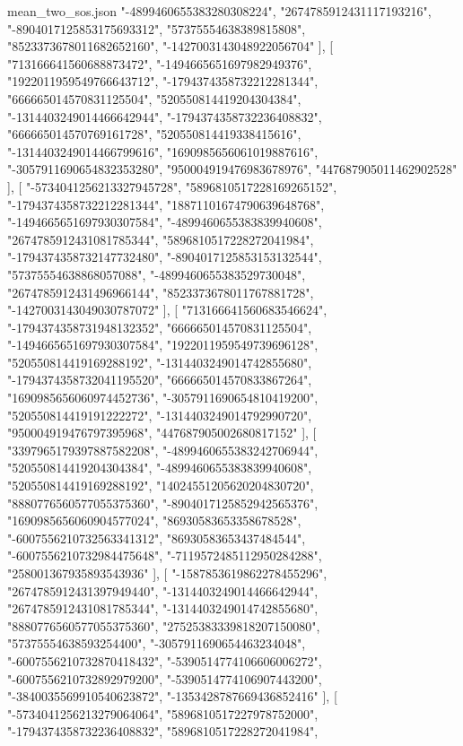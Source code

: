 \begin{filecontents*}[overwrite]{mean_two_sos.json}
    "-4899460655383280308224",
    "2674785912431117193216",
    "-8904017125853175693312",
    "57375554638389815808",
    "8523373678011682652160",
    "-1427003143048922056704"
   ],
   [
    "713166641560688873472",
    "-1494665651697982949376",
    "1922011959549766643712",
    "-1794374358732212281344",
    "666665014570831125504",
    "520550814419204304384",
    "-1314403249014466642944",
    "-1794374358732236408832",
    "666665014570769161728",
    "520550814419338415616",
    "-1314403249014466799616",
    "1690985656061019887616",
    "-3057911690654832353280",
    "950004919476983678976",
    "447687905011462902528"
   ],
   [
    "-5734041256213327945728",
    "5896810517228169265152",
    "-1794374358732212281344",
    "18871101674790639648768",
    "-1494665651697930307584",
    "-4899460655383839940608",
    "2674785912431081785344",
    "5896810517228272041984",
    "-1794374358732147732480",
    "-8904017125853153132544",
    "57375554638868057088",
    "-4899460655383529730048",
    "2674785912431496966144",
    "8523373678011767881728",
    "-1427003143049030787072"
   ],
   [
    "713166641560683546624",
    "-1794374358731948132352",
    "666665014570831125504",
    "-1494665651697930307584",
    "1922011959549739696128",
    "520550814419169288192",
    "-1314403249014742855680",
    "-1794374358732041195520",
    "666665014570833867264",
    "1690985656060974452736",
    "-3057911690654810419200",
    "520550814419191222272",
    "-1314403249014792990720",
    "950004919476797395968",
    "447687905002680817152"
   ],
   [
    "3397965179397887582208",
    "-4899460655383242706944",
    "520550814419204304384",
    "-4899460655383839940608",
    "520550814419169288192",
    "14024551205620204830720",
    "8880776560577055375360",
    "-8904017125852942565376",
    "1690985656060904577024",
    "86930583653358678528",
    "-6007556210732563341312",
    "86930583653437484544",
    "-6007556210732984475648",
    "-7119572485112950284288",
    "258001367935893543936"
   ],
   [
    "-1587853619862278455296",
    "2674785912431397949440",
    "-1314403249014466642944",
    "2674785912431081785344",
    "-1314403249014742855680",
    "8880776560577055375360",
    "27525383339818207150080",
    "57375554638593254400",
    "-3057911690654463234048",
    "-6007556210732870418432",
    "-5390514774106606006272",
    "-6007556210732892979200",
    "-5390514774106907443200",
    "-3840035569910540623872",
    "-1353428787669436852416"
   ],
   [
    "-5734041256213279064064",
    "5896810517227978752000",
    "-1794374358732236408832",
    "5896810517228272041984",

\end{filecontents*}
